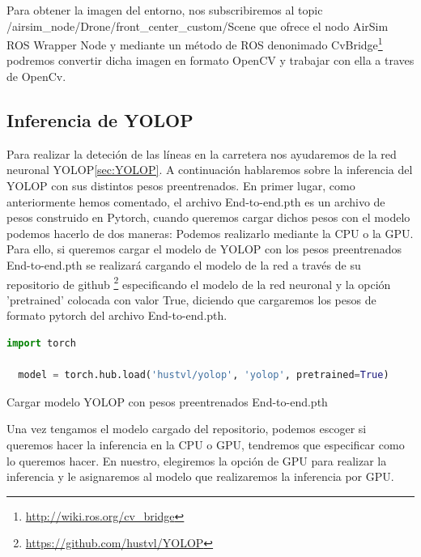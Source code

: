 Para obtener la imagen del entorno, nos subscribiremos al topic /airsim\_node/Drone/front\_center\_custom/Scene que ofrece el nodo AirSim ROS Wrapper Node
 y mediante un método de ROS denonimado CvBridge\footnote{\url{http://wiki.ros.org/cv_bridge}} podremos convertir dicha imagen en formato OpenCV y trabajar con ella a traves de OpenCv.\newline

\subsection{Inferencia de YOLOP}
\label{sec:Inferencia de YOLOP}

Para realizar la deteción de las líneas en la carretera nos ayudaremos de la red neuronal YOLOP\ref{sec:YOLOP}. A continuación hablaremos sobre la inferencia del YOLOP con sus distintos pesos preentrenados. En primer lugar, 
como anteriormente hemos comentado, el archivo End-to-end.pth es un archivo de pesos construido en Pytorch, cuando queremos cargar
dichos pesos con el modelo podemos hacerlo de dos maneras: Podemos realizarlo mediante la CPU o la GPU. 
Para ello, si queremos cargar el modelo de YOLOP con los pesos preentrenados End-to-end.pth se realizará cargando el modelo de la red a través de su repositorio de github \footnote{\url{https://github.com/hustvl/YOLOP}}
especificando el modelo de la red neuronal y la opción 'pretrained' colocada con valor True, diciendo que cargaremos los pesos de formato pytorch del archivo End-to-end.pth.\newline
\begin{code}[h]
  \begin{lstlisting}[language=Python]
  import torch
  
  model = torch.hub.load('hustvl/yolop', 'yolop', pretrained=True)

  \end{lstlisting}
  \caption[Cargar modelo YOLOP con pesos preentrenados End-to-end.pth]{Cargar modelo YOLOP con pesos preentrenados End-to-end.pth}
  \label{cod:codejemplo}
  \end{code}  

Una vez tengamos el modelo cargado del repositorio, podemos escoger si queremos hacer la inferencia en la CPU o GPU, tendremos que especificar como 
lo queremos hacer. En nuestro, elegiremos la opción de GPU para realizar la inferencia y le asignaremos al modelo que realizaremos la inferencia por GPU.\newline

